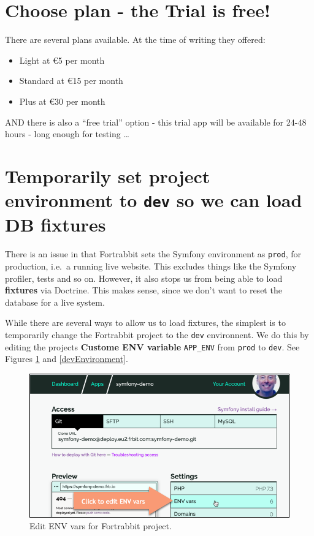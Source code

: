 \documentclass[a4paperpaper,openright]{book}
\providecommand{\tightlist}{%
  \setlength{\itemsep}{0pt}\setlength{\parskip}{0pt}}
\begin{document}
\hypertarget{choose-plan---the-trial-is-free}{%
\section{Choose plan - the Trial is
free!}\label{choose-plan---the-trial-is-free}}

There are several plans available. At the time of writing they offered:

\begin{itemize}
\tightlist
\item
  Light at €5 per month
\item
  Standard at €15 per month
\item
  Plus at €30 per month
\end{itemize}

AND there is also a ``free trial'' option - this trial app will be
available for 24-48 hours - long enough for testing \ldots{}

\hypertarget{temporarily-set-project-environment-to-dev-so-we-can-load-db-fixtures}{%
\section{\texorpdfstring{Temporarily set project environment to
\texttt{dev} so we can load DB
fixtures}{Temporarily set project environment to dev so we can load DB fixtures}}\label{temporarily-set-project-environment-to-dev-so-we-can-load-db-fixtures}}

There is an issue in that Fortrabbit sets the Symfony environment as
\texttt{prod}, for production, i.e.~a running live website. This
excludes things like the Symfony profiler, tests and so on. However, it
also stops us from being able to load \textbf{fixtures} via Doctrine.
This makes sense, since we don't want to reset the database for a live
system.

While there are several ways to allow us to load fixtures, the simplest
is to temporarily change the Fortrabbit project to the \texttt{dev}
environnent. We do this by editing the projects \textbf{Custome ENV
variable} \texttt{APP\_ENV} from \texttt{prod} to \texttt{dev}. See
Figures \ref{editEnv} and \ref{devEnvironment}.

\begin{figure}
\centering
\includegraphics{./tex2pdf.-05a85d9d563be472/95149fc53c4e728e7b82aea00b5ceba9c8bbe42e.png}
\caption{Edit ENV vars for Fortrabbit project.\label{editEnv}}
\end{figure}
\end{document}

